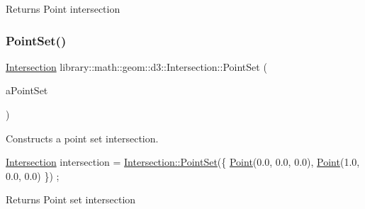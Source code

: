 \begin{DoxyReturn}{Returns}
Point intersection 
\end{DoxyReturn}
\mbox{\label{classlibrary_1_1math_1_1geom_1_1d3_1_1_intersection_a562d64d802f6fcd181f1122393642605}} 
\subsubsection{\texorpdfstring{Point\+Set()}{PointSet()}}
{\footnotesize\ttfamily \hyperlink{classlibrary_1_1math_1_1geom_1_1d3_1_1_intersection}{Intersection} library\+::math\+::geom\+::d3\+::\+Intersection\+::\+Point\+Set (\begin{DoxyParamCaption}\item[{const \hyperlink{classlibrary_1_1math_1_1geom_1_1d3_1_1objects_1_1_point_set}{objects\+::\+Point\+Set} \&}]{a\+Point\+Set }\end{DoxyParamCaption})\hspace{0.3cm}{\ttfamily [static]}}



Constructs a point set intersection. 


\begin{DoxyCode}
\hyperlink{classlibrary_1_1math_1_1geom_1_1d3_1_1_intersection_afbaef540a058ccc7e58f1be2585304a9}{Intersection} intersection = \hyperlink{classlibrary_1_1math_1_1geom_1_1d3_1_1_intersection_a562d64d802f6fcd181f1122393642605}{Intersection::PointSet}(\{ 
      \hyperlink{classlibrary_1_1math_1_1geom_1_1d3_1_1_intersection_a5155cc245bd2bf96a4296b0a8319c709}{Point}(0.0, 0.0, 0.0), \hyperlink{classlibrary_1_1math_1_1geom_1_1d3_1_1_intersection_a5155cc245bd2bf96a4296b0a8319c709}{Point}(1.0, 0.0, 0.0) \}) ;
\end{DoxyCode}


\begin{DoxyReturn}{Returns}
Point set intersection 
\end{DoxyReturn}
\mbox{\label{classlibrary_1_1math_1_1geom_1_1d3_1_1_intersection_a7294c6aa40d2353f1f4d7d6019c9dbdc}} 
